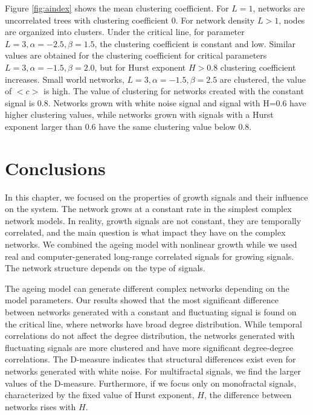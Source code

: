 Figure \ref{fig:aindex} shows the mean clustering coefficient. For $L=1$, networks are uncorrelated trees with clustering coefficient $0$. For network density $L>1$, nodes are organized into clusters. Under the critical line, for parameter $L=3, \alpha=-2.5, \beta=1.5 $, the clustering coefficient is constant and low. Similar values are obtained for the clustering coefficient for critical parameters $L=3, \alpha=-1.5, \beta=2.0$, but for Hurst exponent $H>0.8$ clustering coefficient increases. Small world networks,  $L=3, \alpha=-1.5, \beta=2.5$ are clustered, the value of $<c>$ is high.  The value of clustering for networks created with the constant signal is 0.8. Networks grown with white noise signal and signal with H=0.6 have higher clustering values, while networks grown with signals with a Hurst exponent larger than 0.6 have the same clustering value below 0.8. 

\section{Conclusions}

In this chapter, we focused on the properties of growth signals and their influence on the system. The network grows at a constant rate in the simplest complex network models. In reality, growth signals are not constant, they are temporally correlated, and the main question is what impact they have on the complex networks. We combined the ageing model with nonlinear growth while we used real and computer-generated long-range correlated signals for growing signals. The network structure depends on the type of signals.

The ageing model can generate different complex networks depending on the model parameters. Our results showed that the most significant difference between networks generated with a constant and fluctuating signal is found on the critical line, where networks have broad degree distribution. While temporal correlations do not affect the degree distribution, the networks generated with fluctuating signals are more clustered and have more significant degree-degree correlations. The D-measure indicates that structural differences exist even for networks generated with white noise. For multifractal signals, we find the larger values of the D-measure. Furthermore, if we focus only on monofractal signals, characterized by the fixed value of Hurst exponent, $H$, the difference between networks rises with $H$. 

